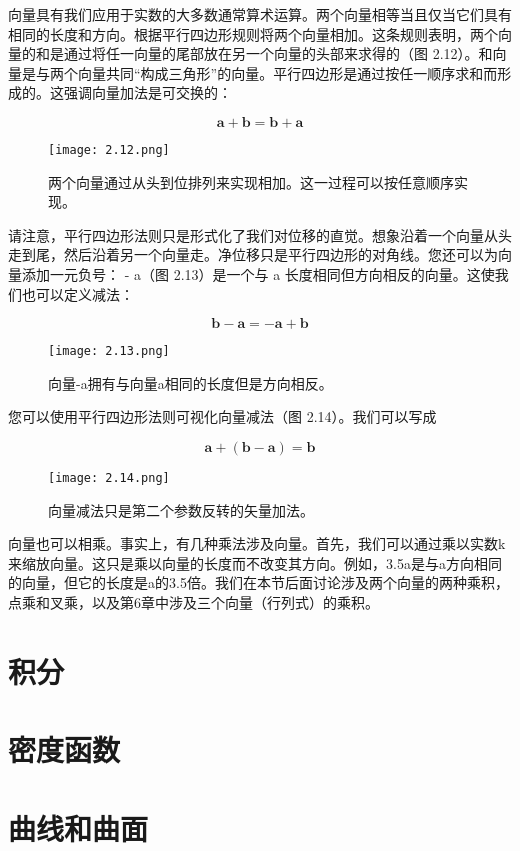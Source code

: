 \documentclass[lang=cn,12pt]{elegantbook}
\begin{document}
向量具有我们应用于实数的大多数通常算术运算。两个向量相等当且仅当它们具有相同的长度和方向。根据平行四边形规则将两个向量相加。这条规则表明，两个向量的和是通过将任一向量的尾部放在另一个向量的头部来求得的（图 2.12）。和向量是与两个向量共同“构成三角形”的向量。平行四边形是通过按任一顺序求和而形成的。这强调向量加法是可交换的：

$$
\mathbf{a}+\mathbf{b}=\mathbf{b}+\mathbf{a}
$$

\begin{figure}[htbp]
\centering
\texttt{[image: 2.12.png]}
\caption{两个向量通过从头到位排列来实现相加。这一过程可以按任意顺序实现。}
\end{figure}

请注意，平行四边形法则只是形式化了我们对位移的直觉。想象沿着一个向量从头走到尾，然后沿着另一个向量走。净位移只是平行四边形的对角线。您还可以为向量添加一元负号： - a（图 2.13）是一个与 a 长度相同但方向相反的向量。这使我们也可以定义减法：

$$
\mathbf{b}-\mathbf{a}=-\mathbf{a}+\mathbf{b}
$$

\begin{figure}[htbp]
\centering
\texttt{[image: 2.13.png]}
\caption{向量-a拥有与向量a相同的长度但是方向相反。}
\end{figure}

您可以使用平行四边形法则可视化向量减法（图 2.14）。我们可以写成

$$
\mathbf{a}+(\mathbf{b}-\mathbf{a})=\mathbf{b}
$$

\begin{figure}[htbp]
\centering
\texttt{[image: 2.14.png]}
\caption{向量减法只是第二个参数反转的矢量加法。}
\end{figure}

向量也可以相乘。事实上，有几种乘法涉及向量。首先，我们可以通过乘以实数k来缩放向量。这只是乘以向量的长度而不改变其方向。例如，3.5a是与a方向相同的向量，但它的长度是a的3.5倍。我们在本节后面讨论涉及两个向量的两种乘积，点乘和叉乘，以及第6章中涉及三个向量（行列式）的乘积。

\section{积分}

\section{密度函数}

\section{曲线和曲面}
\end{document}
